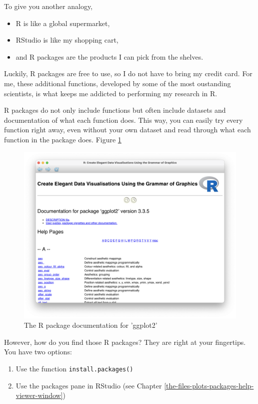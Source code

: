 \documentclass[
]{book}
\begin{document}
To give you another analogy,

\begin{itemize}
\item
  R is like a global supermarket,
\item
  RStudio is like my shopping cart,
\item
  and R packages are the products I can pick from the shelves.
\end{itemize}

Luckily, R packages are free to use, so I do not have to bring my credit card. For me, these additional functions, developed by some of the most oustanding scientists, is what keeps me addicted to performing my research in R.

R packages do not only include functions but often include datasets and documentation of what each function does. This way, you can easily try every function right away, even without your own dataset and read through what each function in the package does. Figure \ref{fig:img-r-package-documentation}

\begin{figure}
\includegraphics[width=28.08in]{images/chapter_05_img/r_package_documentation} \caption{The R package documentation for 'ggplot2'}\label{fig:img-r-package-documentation}
\end{figure}

However, how do you find those R packages? They are right at your fingertips. You have two options:

\begin{enumerate}
\def\labelenumi{\arabic{enumi}.}
\item
  Use the function \texttt{install.packages()}
\item
  Use the packages pane in RStudio (see Chapter \ref{the-files-plots-packages-help-viewer-window})
\end{enumerate}
\end{document}
